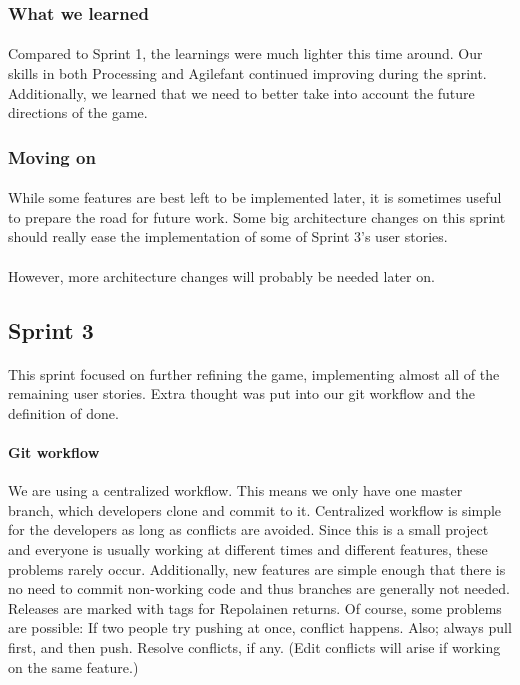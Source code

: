 \subsubsection{What we learned}

\paragraph{} Compared to Sprint 1, the learnings were much lighter this time around. Our skills in both Processing and Agilefant continued improving during the sprint. Additionally, we learned that we need to better take into account the future directions of the game.

\subsubsection{Moving on}

\paragraph{} While some features are best left to be implemented later, it is sometimes useful to prepare the road for future work. Some big architecture changes on this sprint should really ease the implementation of some of Sprint 3's user stories.

\paragraph{} However, more architecture changes will probably be needed later on.


\subsection{Sprint 3}

\paragraph{} This sprint focused on further refining the game, implementing almost all of the remaining user stories. Extra thought was put into our git workflow and the definition of done.

\paragraph{Git workflow} We are using a centralized workflow. This means we only have one master branch, which developers clone and commit to it. Centralized workflow is simple for the developers as long as conflicts are avoided. Since this is a small project and everyone is usually working at different times and different features, these problems rarely occur. Additionally, new features are simple enough that there is no need to commit non-working code and thus branches are generally not needed. Releases are marked with tags for Repolainen returns. Of course, some problems are possible: If two people try pushing at once, conflict happens. Also; always pull first, and then push. Resolve conflicts, if any. (Edit conflicts will arise if working on the same feature.)

